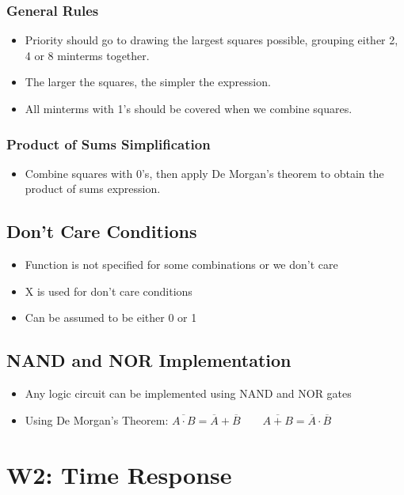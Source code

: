\documentclass[a4paper]{article}
\begin{document}
\subsubsection{General Rules}
\begin{itemize}
    \item Priority should go to drawing the largest squares possible, grouping either 2, 4 or 8 minterms together.
    \item The larger the squares, the simpler the expression.
    \item All minterms with 1's should be covered when we combine squares.
\end{itemize}

\subsubsection{Product of Sums Simplification}
\begin{itemize}
    \item Combine squares with 0's, then apply De Morgan's theorem to obtain the product of sums expression.
\end{itemize}

\subsection{Don't Care Conditions}
\begin{itemize}
    \item Function is not specified for some combinations or we don't care
    \item X is used for don't care conditions
    \item Can be assumed to be either 0 or 1
\end{itemize}

\subsection{NAND and NOR Implementation}
\begin{itemize}
    \item Any logic circuit can be implemented using NAND and NOR gates
    \item Using De Morgan's Theorem: \quad $\overline{A\cdot B} = \overline{A}+\overline{B} \qquad \overline{A+B} = \overline{A}\cdot\overline{B}$
\end{itemize}

\newpage
\section{W2: Time Response}
\end{document}

